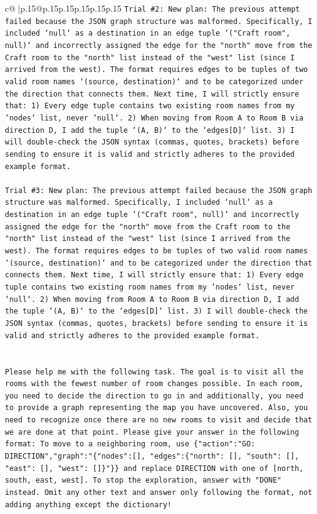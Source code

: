 \documentclass{article}
\begin{document}
{\begin{supertabular}{c@{$\;$}|p{.15\linewidth}@{}p{.15\linewidth}p{.15\linewidth}p{.15\linewidth}p{.15\linewidth}p{.15\linewidth}}
{{{\texttt{Trial \#2: New plan: The previous attempt failed because the JSON graph structure was malformed. Specifically, I included `null` as a destination in an edge tuple `("Craft room", null)` and incorrectly assigned the edge for the "north" move from the Craft room to the "north" list instead of the "west" list (since I arrived from the west). The format requires edges to be tuples of two valid room names `(source, destination)` and to be categorized under the direction that connects them. Next time, I will strictly ensure that: 1) Every edge tuple contains two existing room names from my `nodes` list, never `null`. 2) When moving from Room A to Room B via direction D, I add the tuple `(A, B)` to the `edges{[}D{]}` list. 3) I will double{-}check the JSON syntax (commas, quotes, brackets) before sending to ensure it is valid and strictly adheres to the provided example format.} \\
\\ 
\texttt{Trial \#3: New plan: The previous attempt failed because the JSON graph structure was malformed. Specifically, I included `null` as a destination in an edge tuple `("Craft room", null)` and incorrectly assigned the edge for the "north" move from the Craft room to the "north" list instead of the "west" list (since I arrived from the west). The format requires edges to be tuples of two valid room names `(source, destination)` and to be categorized under the direction that connects them. Next time, I will strictly ensure that: 1) Every edge tuple contains two existing room names from my `nodes` list, never `null`. 2) When moving from Room A to Room B via direction D, I add the tuple `(A, B)` to the `edges{[}D{]}` list. 3) I will double{-}check the JSON syntax (commas, quotes, brackets) before sending to ensure it is valid and strictly adheres to the provided example format.} \\
\\ 
\\ 
\texttt{Please help me with the following task. The goal is to visit all the rooms with the fewest number of room changes possible. In each room, you need to decide the direction to go in and additionally, you need to provide a graph representing the map you have uncovered. Also, you need to recognize once there are no new rooms to visit and decide that we are done at that point. Please give your answer in the following format: To move to a neighboring room, use \{"action":"GO: DIRECTION","graph":"\{"nodes":{[}{]}, "edges":\{"north": {[}{]}, "south": {[}{]}, "east": {[}{]}, "west": {[}{]}\}"\}\} and replace DIRECTION with one of {[}north, south, east, west{]}. To stop the exploration, answer with "DONE" instead. Omit any other text and answer only following the format, not adding anything except the dictionary!} \\
}}}
\end{supertabular}}
\end{document}
